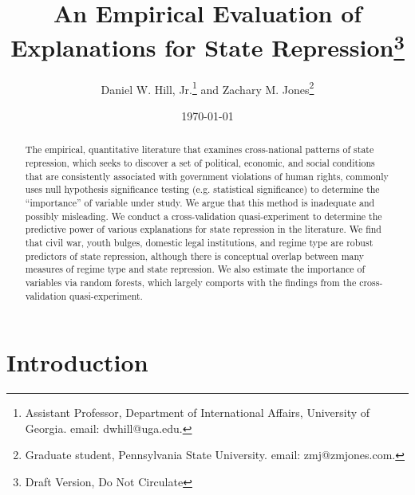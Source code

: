 \documentclass[12pt]{article}
\begin{document}
\vspace{50mm}
\date{\today}
\title{An Empirical Evaluation of Explanations for State Repression\thanks{Draft Version, Do Not Circulate}}
\bigskip
\author{Daniel W. Hill, Jr.\thanks{Assistant Professor, Department of International Affairs,
University of Georgia. email: dwhill@uga.edu.} and Zachary M. Jones\thanks{Graduate student, Pennsylvania State University. email: zmj@zmjones.com.}}

\maketitle \thispagestyle{empty}

\clearpage
\onehalfspace

\begin{abstract}
The empirical, quantitative literature that examines cross-national patterns of state repression, which seeks to discover a set of political, economic, and social conditions that are consistently associated with government violations of human rights, commonly uses null hypothesis significance testing (e.g. statistical significance) to determine the ``importance'' of variable under study. We argue that this method is inadequate and possibly misleading. We conduct a cross-validation quasi-experiment to determine the predictive power of various explanations for state repression in the literature. We find that civil war, youth bulges, domestic legal institutions, and regime type are robust predictors of state repression, although there is conceptual overlap between many measures of regime type and state repression. We also estimate the importance of variables via random forests, which largely comports with the findings from the cross-validation quasi-experiment. 
\end{abstract}

\clearpage

\section{Introduction}
\end{document}
